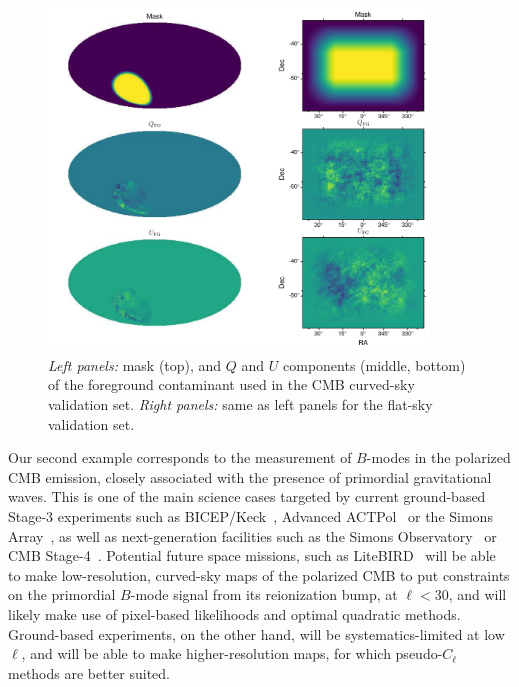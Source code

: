 \documentclass[usenatbib]{mnrasb}
\begin{document}
        \begin{figure}
          \centering
          \includegraphics[width=0.9\textwidth]{maps_cmb}
          \caption{{\sl Left panels:} mask (top), and $Q$ and $U$ components (middle, bottom) of the foreground contaminant used in the CMB curved-sky validation set. {\sl Right panels:} same as left panels for the flat-sky validation set.}
          \label{fig:cmb_mocks}
        \end{figure}
        Our second example corresponds to the measurement of $B$-modes in the polarized CMB emission, closely associated with the presence of primordial gravitational waves. This is one of the main science cases targeted by current ground-based Stage-3 experiments such as BICEP/Keck~\citep{2016PhRvL.116c1302B}, Advanced ACTPol~\citep{2016SPIE.9910E..14D,2017JCAP...06..031L} or the Simons Array~\citep{2016JLTP..184..805S,2017ApJ...848..121P}, as well as next-generation facilities such as the Simons Observatory~\citep{2018arXiv180807445T} or CMB Stage-4~\citep{2016arXiv161002743A}. Potential future space missions, such as LiteBIRD~\citep{2018JLTP..tmp..124S} will be able to make low-resolution, curved-sky maps of the polarized CMB to put constraints on the primordial $B$-mode signal from its reionization bump, at $\ell<30$, and will likely make use of pixel-based likelihoods and optimal quadratic methods. Ground-based experiments, on the other hand, will be systematics-limited at low $\ell$, and will be able to make higher-resolution maps, for which pseudo-$C_\ell$ methods are better suited.
        
\end{document}
